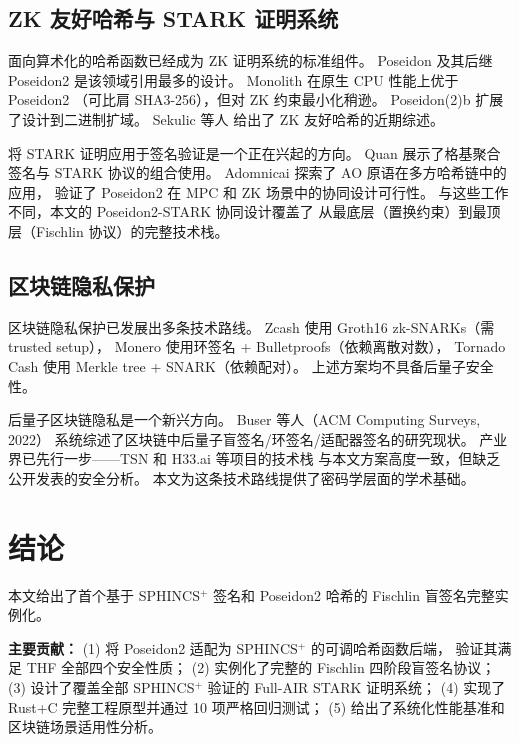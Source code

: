 \documentclass[11pt,a4paper]{ctexart}
\begin{document}
\subsection{ZK 友好哈希与 STARK 证明系统}

面向算术化的哈希函数已经成为 ZK 证明系统的标准组件。
Poseidon \cite{Grassi2019Poseidon} 及其后继 Poseidon2
\cite{Grassi2023Poseidon2} 是该领域引用最多的设计。
Monolith \cite{Grassi2024Monolith} 在原生 CPU 性能上优于 Poseidon2
（可比肩 SHA3-256），但对 ZK 约束最小化稍逊。
Poseidon(2)b \cite{Grassi2026Poseidon2b} 扩展了设计到二进制扩域。
Sekulic 等人 \cite{Sekulic2025} 给出了 ZK 友好哈希的近期综述。

将 STARK 证明应用于签名验证是一个正在兴起的方向。
Quan \cite{Quan2022} 展示了格基聚合签名与 STARK 协议的组合使用。
Adomnicai \cite{Adomnicai2026} 探索了 AO 原语在多方哈希链中的应用，
验证了 Poseidon2 在 MPC 和 ZK 场景中的协同设计可行性。
与这些工作不同，本文的 Poseidon2-STARK 协同设计覆盖了
从最底层（置换约束）到最顶层（Fischlin 协议）的完整技术栈。

\subsection{区块链隐私保护}

区块链隐私保护已发展出多条技术路线。
Zcash 使用 Groth16 zk-SNARKs（需 trusted setup），
Monero 使用环签名 + Bulletproofs（依赖离散对数），
Tornado Cash 使用 Merkle tree + SNARK（依赖配对）。
上述方案均不具备后量子安全性。

后量子区块链隐私是一个新兴方向。
Buser 等人（ACM Computing Surveys, 2022）\cite{Buser2022ExoticSigs}
系统综述了区块链中后量子盲签名/环签名/适配器签名的研究现状。
产业界已先行一步——TSN 和 H33.ai 等项目的技术栈
与本文方案高度一致，但缺乏公开发表的安全分析。
本文为这条技术路线提供了密码学层面的学术基础。

\section{结论}

本文给出了首个基于 SPHINCS$^+$ 签名和 Poseidon2 哈希的
Fischlin 盲签名完整实例化。

\textbf{主要贡献：}
(1) 将 Poseidon2 适配为 SPHINCS$^+$ 的可调哈希函数后端，
验证其满足 THF 全部四个安全性质；
(2) 实例化了完整的 Fischlin 四阶段盲签名协议；
(3) 设计了覆盖全部 SPHINCS$^+$ 验证的 Full-AIR STARK 证明系统；
(4) 实现了 Rust+C 完整工程原型并通过 10 项严格回归测试；
(5) 给出了系统化性能基准和区块链场景适用性分析。
\end{document}
